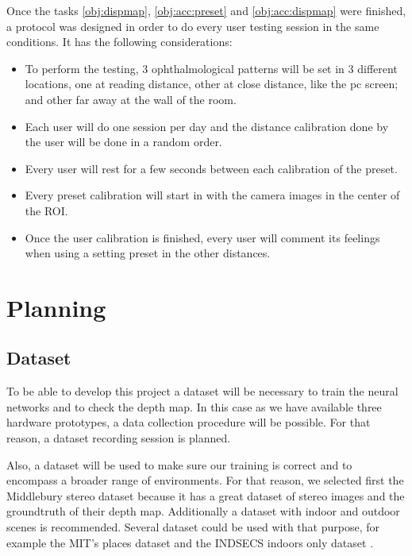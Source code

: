 \documentclass[10pt,a4paper,twocolumn,twoside]{article}
\begin{document}
	Once the tasks \ref{obj:dispmap}, \ref{obj:acc:preset} and \ref{obj:acc:dispmap} were finished, a protocol was designed in order to do every user testing session in the same conditions. It has the following considerations: 

	\begin{itemize}
		\item To perform the testing, 3 ophthalmological patterns will be set in 3 different locations, one at reading distance, other at close distance, like the pc screen; and other far away at the wall of the room. 
		\item  Each user will do one session per day and the distance calibration done by the user will be done in a random order. 
		\item  Every user will rest for a few seconds between each calibration of the preset.  
		\item  Every preset calibration will start in with the camera images in the center of the ROI. 
		\item  Once the user calibration is finished, every user will comment its feelings when using a setting preset in the other distances. 
	\end{itemize}
	
	
	\section{Planning}
	\label{sec:planning}
	
	\subsection{Dataset}
	\label{subsec:dataset}
	To be able to develop this project a dataset will be necessary to train the neural networks and to check the depth map. In this case as we have available three hardware prototypes, a data collection procedure will be possible. For that reason, a dataset recording session is planned.
	
	Also, a dataset will be used to make sure our training is correct and to encompass a broader range of environments. For that reason, we selected first the Middlebury stereo dataset \cite{web:middelburyDataset} because it has a great dataset of stereo images and the groundtruth of their depth map. Additionally a dataset with indoor and outdoor scenes is recommended. Several dataset could be used with that purpose, for example the MIT's places dataset \cite{web:mitplaces} and the INDSECS indoors only dataset \cite{web:indecs}.
	
\end{document}

